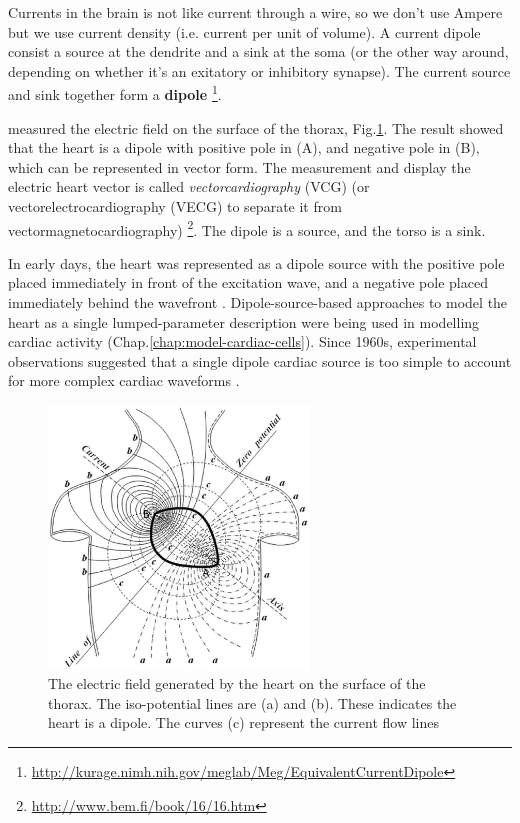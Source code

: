 Currents in the brain is not like current through a wire, so we don't use Ampere
but we use current density (i.e. current per unit of volume). A current dipole
consist a source at the dendrite and a sink at the soma (or the other way
around, depending on whether it's an exitatory or inhibitory synapse). The
current source and sink together form a {\bf dipole}
\footnote{\url{http://kurage.nimh.nih.gov/meglab/Meg/EquivalentCurrentDipole}}.

\citep{waller1887} measured the electric field on the surface of the thorax,
Fig.\ref{fig:heart_dipole}. The result showed that the heart is a dipole with
positive pole in (A), and negative pole in (B), which can be represented in
vector form. The measurement and display the electric heart vector is called
{\it vectorcardiography} (VCG) (or vectorelectrocardiography (VECG) to separate
it from vectormagnetocardiography)
\footnote{\url{http://www.bem.fi/book/16/16.htm}}. The dipole is a source, and
the torso is a sink.


% 
In early days, the heart was represented as a dipole source with the positive
pole placed immediately in front of the excitation wave, and a negative pole
placed immediately behind the wavefront \citep{wilson1933}. Dipole-source-based
approaches to model the heart as a single lumped-parameter description were
being used in modelling cardiac activity (Chap.\ref{chap:model-cardiac-cells}).
Since 1960s, experimental observations suggested that a single dipole cardiac
source is too simple to account for more complex cardiac waveforms
\citep{taccardi1963}. 

\begin{figure}[hbt]
  \centerline{\includegraphics[height=7cm,
    angle=0]{./images/heart_dipole.eps}}
  \caption{The electric field generated by the heart on the surface of the
  thorax. The iso-potential lines are (a) and (b). These indicates the heart is
  a dipole. The curves (c) represent the current flow lines}
  \label{fig:heart_dipole}
\end{figure}

